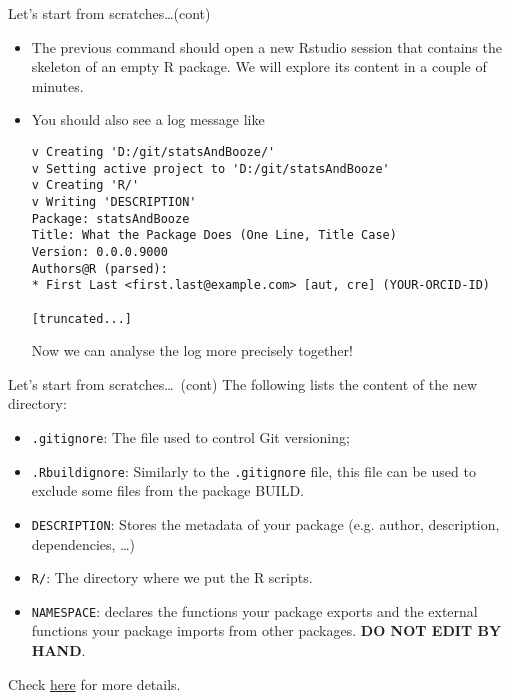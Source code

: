 \documentclass[
hyperref={bookmarks=false},
xcolor={dvipsnames,svgnames*,x11names*}, 
12pt
]{beamer}
\begin{document}
\begin{frame}[fragile]{Let's start from scratches\dots\;(cont)}
\vspace{-0.5cm}
\begin{itemize}
\itemsep 1ex
\item The previous command should open a new Rstudio session that contains the skeleton of an empty R package. We will explore its content in a couple of minutes.  
\item You should also see a log message like
\begin{lstlisting}
v Creating 'D:/git/statsAndBooze/'
v Setting active project to 'D:/git/statsAndBooze'
v Creating 'R/'
v Writing 'DESCRIPTION'
Package: statsAndBooze
Title: What the Package Does (One Line, Title Case)
Version: 0.0.0.9000
Authors@R (parsed):
* First Last <first.last@example.com> [aut, cre] (YOUR-ORCID-ID)

[truncated...]
\end{lstlisting}
Now we can analyse the log more precisely together! 
\end{itemize}
\end{frame}

\begin{frame}{Let's start from scratches\dots\, (cont)}
\vspace{-0.5cm}
The following lists the content of the new directory: 
\begin{itemize}
\item \texttt{.gitignore}: The file used to control Git versioning; 
\item \texttt{.Rbuildignore}: Similarly to the \texttt{.gitignore} file, this file can be used to exclude some files from the package BUILD. 
\item \texttt{DESCRIPTION}: Stores the metadata of your package (e.g. author, description, dependencies, \dots)
\item \texttt{R/}: The directory where we put the R scripts. 
\item \texttt{NAMESPACE}: declares the functions your package exports and the external functions your package imports from other packages. \textbf{DO NOT EDIT BY HAND}. 
\end{itemize}
Check \href{https://r-pkgs.org/whole-game.html\#create_package}{here} for more details. 
\end{frame}
\end{document}
